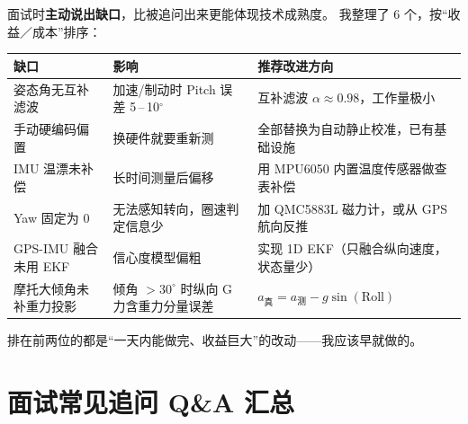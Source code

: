 \documentclass[UTF8,11pt,a4paper]{ctexart}
\begin{document}
\begin{candidate}
面试时\textbf{主动说出缺口}，比被追问出来更能体现技术成熟度。
我整理了 6 个，按``收益／成本''排序：

\begin{center}
\begin{tabularx}{\linewidth}{p{3.8cm}p{4.4cm}X}
\toprule
缺口 & 影响 & 推荐改进方向 \\
\midrule
姿态角无互补滤波 & 加速/制动时 Pitch 误差 5\,–\,10$^\circ$ & 互补滤波 $\alpha\approx 0.98$，工作量极小 \\
手动硬编码偏置 & 换硬件就要重新测 & 全部替换为自动静止校准，已有基础设施 \\
IMU 温漂未补偿 & 长时间测量后偏移 & 用 MPU6050 内置温度传感器做查表补偿 \\
Yaw 固定为 0    & 无法感知转向，圈速判定信息少 & 加 QMC5883L 磁力计，或从 GPS 航向反推 \\
GPS-IMU 融合未用 EKF & 信心度模型偏粗 & 实现 1D EKF（只融合纵向速度，状态量少） \\
摩托大倾角未补重力投影 & 倾角 $> 30^\circ$ 时纵向 G 力含重力分量误差 & $a_{\text{真}} = a_{\text{测}} - g\sin(\text{Roll})$ \\
\bottomrule
\end{tabularx}
\end{center}

\medskip
排在前两位的都是``一天内能做完、收益巨大''的改动——我应该早就做的。
\end{candidate}

\section{面试常见追问 Q\&A 汇总}
\end{document}
